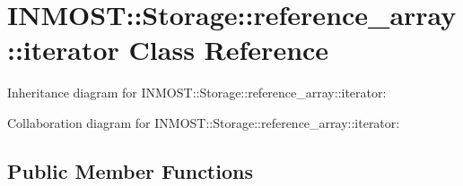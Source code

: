 \hypertarget{classINMOST_1_1Storage_1_1reference__array_1_1iterator}{\section{I\-N\-M\-O\-S\-T\-:\-:Storage\-:\-:reference\-\_\-array\-:\-:iterator Class Reference}
\label{classINMOST_1_1Storage_1_1reference__array_1_1iterator}
}


Inheritance diagram for I\-N\-M\-O\-S\-T\-:\-:Storage\-:\-:reference\-\_\-array\-:\-:iterator\-:


Collaboration diagram for I\-N\-M\-O\-S\-T\-:\-:Storage\-:\-:reference\-\_\-array\-:\-:iterator\-:
\subsection*{Public Member Functions}
